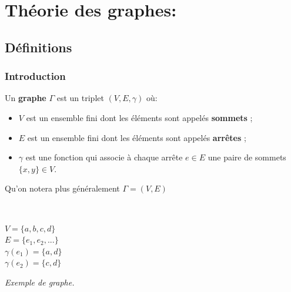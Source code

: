 \documentclass[11pt]{article}
\begin{document}
\section{Théorie des graphes:}
	\subsection{Définitions} 
		\subsubsection{Introduction}
	
			Un \textbf{graphe} $\Gamma$ est un triplet $(V,E,\gamma)$ où:
			\begin{itemize}
				\item $V$ est un ensemble fini dont les éléments sont appelés \textbf{sommets} ;
				\item $E$ est un ensemble fini dont les éléments sont appelés \textbf{arrêtes} ;
				\item $\gamma$ est une fonction qui associe à chaque arrête $e \in E$ une paire de sommets $\{x,y\} \in V$.
			\end{itemize}
			Qu'on notera plus généralement $\Gamma=(V,E)$
			
			\begin{minipage}{0.5\textwidth}
			\center  
			 \\
			\end{minipage}\hfill
			\begin{minipage}{0.5\textwidth}
			\center
			$V = \{a,b,c,d\}$ \\
			$E = \{e_1, e_2, ...\}$ \\
			$\gamma(e_1)=\{a,d\}$ \\
			$\gamma(e_2)=\{c,d\}$\\
			\end{minipage}
			\begin{center}
			\textit{Exemple de graphe.} \\
			\end{center}
\end{document}
